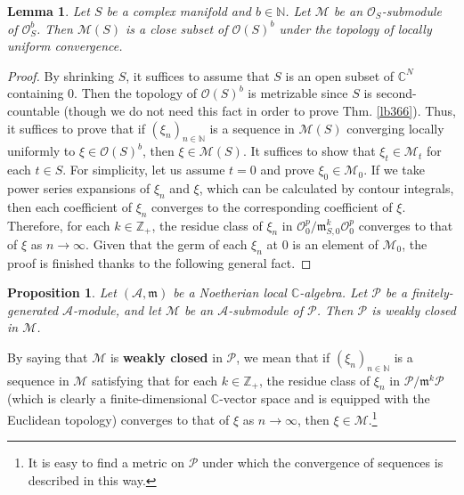 \documentclass[12pt,b5paper,notitlepage]{report}
\theoremstyle{definition}
\theoremstyle{plain}
\newtheorem{pp}[df]{Proposition}
\newtheorem{lm}[df]{Lemma}
\newcommand{\mc}{\mathcal}
\newcommand{\scr}{\mathscr}
\newcommand{\Cbb}{\mathbb C}
\newcommand{\Nbb}{\mathbb N}
\newcommand{\Zbb}{\mathbb Z}
\newcommand{\mk}{\mathfrak m}
\numberwithin{equation}{section}
\begin{document}
\begin{lm}
Let $S$ be a complex manifold and $b\in\Nbb$. Let $\scr M$ be an $\scr O_S$-submodule of $\scr O_S^b$. Then $\scr M(S)$ is a close subset of $\scr O(S)^b$ under the topology of locally uniform convergence.
\end{lm}


\begin{proof}
By shrinking $S$, it suffices to assume that $S$ is an open subset of $\Cbb^N$ containing $0$. Then the topology of $\scr O(S)^b$ is metrizable since $S$ is second-countable (though we do not need this fact in order to prove Thm. \ref{lb366}). Thus, it suffices to prove that if $(\xi_n)_{n\in\Nbb}$ is a sequence in $\scr M(S)$ converging locally uniformly to $\xi\in\scr O(S)^b$, then $\xi\in\scr M(S)$. It suffices to show that $\xi_t\in\scr M_t$ for each $t\in S$. For simplicity, let us assume $t=0$ and prove $\xi_0\in\scr M_0$. If we take power series expansions of $\xi_n$ and $\xi$, which can be calculated by contour integrals, then each coefficient of $\xi_n$ converges to the corresponding coefficient of $\xi$. Therefore, for each $k\in\Zbb_+$, the residue class of $\xi_n$ in $\scr O_0^p/\mk_{S,0}^k\scr O_0^p$  converges  to that of $\xi$ as $n\rightarrow\infty$. Given that the germ of each $\xi_n$ at $0$ is an element of $\scr M_0$, the proof is finished thanks to the following general fact. 
\end{proof}


\begin{pp}
Let $(\mc A,\mk)$ be a Noetherian local $\Cbb$-algebra. Let $\mc P$ be a finitely-generated $\mc A$-module, and let $\mc M$ be an $\mc A$-submodule of $\mc P$. Then $\mc P$ is weakly closed in $\mc M$.
\end{pp}

By saying that $\mc M$ is \textbf{weakly closed} in $\mc P$, we mean that if $(\xi_n)_{n\in\Nbb}$ is a sequence in $\mc M$ satisfying that for each $k\in\Zbb_+$, the residue class of $\xi_n$ in $\mc P/\mk^k\mc P$ (which is clearly a finite-dimensional $\Cbb$-vector space and is equipped with the Euclidean topology) converges to that of $\xi$ as $n\rightarrow\infty$, then $\xi\in\mc M$.\footnote{It is easy to find a metric on $\mc P$ under which the convergence of sequences is described in this way.} 
\end{document}
